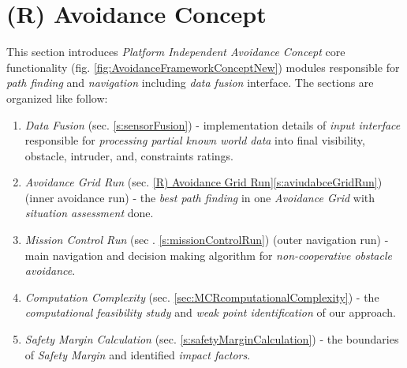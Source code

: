 \newpage
\section{(R) Avoidance Concept}\label{s:avoidanceConcept}
This section introduces \emph{Platform Independent Avoidance Concept} core functionality (fig. \ref{fig:AvoidanceFrameworkConceptNew}) modules responsible for \emph{path finding} and \emph{navigation} including \emph{data fusion} interface. The sections are organized like follow:

\begin{enumerate}
    \item \emph{Data Fusion} (sec. \ref{s:sensorFusion}) - implementation details of \emph{input interface} responsible for \emph{processing partial known world data} into final visibility, obstacle, intruder, and, constraints ratings.
    
    \item \emph{Avoidance Grid Run} (sec. \ref{R) Avoidance Grid Run}\ref{s:aviudabceGridRun}) (inner avoidance run) - the \emph{best path finding} in one \emph{Avoidance Grid} with \emph{situation assessment} done.
    
    \item \emph{Mission Control Run} (sec . \ref{s:missionControlRun}) (outer navigation run) - main navigation and decision making algorithm for \emph{non-cooperative obstacle avoidance}.
    
    \item \emph{Computation Complexity} (sec. \ref{sec:MCRcomputationalComplexity}) - the \emph{computational feasibility study} and \emph{weak point identification} of our approach.
    
    \item \emph{Safety Margin Calculation} (sec. \ref{s:safetyMarginCalculation}) - the boundaries of \emph{Safety Margin} and identified \emph{impact factors}.
\end{enumerate}
